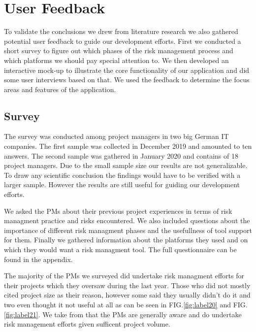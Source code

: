 
\section{User Feedback}
\label{sec:DomainA}
To validate the conclusions we drew from literature research we also gathered potential user feedback to guide our development efforts. First we conducted a short survey to figure out which phases of the risk management process and which platforms we should pay special attention to. We then developed an interactive mock-up to illustrate the core functionality of our application and did some user interviews based on that. We used the feedback to determine the focus areas and features of the application.
\subsection{Survey}
\label{sec:DomainAa}
The survey was conducted among project managers in two big German IT companies. The first sample was collected in December 2019 and amounted to ten answers. The second sample was gathered in January 2020 and contains of 18 project managers. Due to the small sample size our results are not generalizable. To draw any scientific conclusion the findings would have to be verified with a larger sample. However the results are still useful for guiding our development efforts.

We asked the PMs about their previous project experiences in terms of risk managment practice and risks encountered. We also included questions about the importance of different risk managment phases and the usefullness of tool support for them. Finally we gathered information about the platforms they used and on which they would want a risk managment tool. The full questionnaire can be found in the appendix.

The majority of the PMs we surveyed did undertake risk managment efforts for their projects which they oversaw during the last year. Those who did not mostly cited project size as their reason, however some said they usually didn't do it and two even thought it not useful at all as can be seen in FIG.\ref{fig:label20} and FIG.\ref{fig:label21}. We take from that the PMs are generally aware and do undertake risk management efforts given sufficent project volume.

